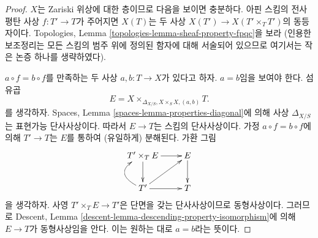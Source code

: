\begin{proof}
$X$는 Zariski 위상에 대한 층이므로 다음을 보이면 충분하다.
아핀 스킴의 전사 평탄 사상 $f : T' \to T$가 주어지면
$X(T)$는 두 사상 $X(T') \to X(T' \times_T T')$의 동등자이다.
Topologies, Lemma \ref{topologies-lemma-sheaf-property-fpqc}을 보라
(인용한 보조정리는 모든 스킴의 범주 위에 정의된 함자에 대해
서술되어 있으므로 여기서는 작은 논증 하나를 생략하였다).

\medskip\noindent
$a \circ f = b \circ f$를 만족하는 두 사상
$a, b : T \to X$가 있다고 하자. $a = b$임을 보여야 한다.
섬유곱
$$
E = X \times_{\Delta_{X/S}, X \times_S X, (a, b)} T.
$$
를 생각하자. Spaces, Lemma \ref{spaces-lemma-properties-diagonal}에 의해
사상 $\Delta_{X/S}$는 표현가능 단사사상이다. 따라서
$E \to T$는 스킴의 단사사상이다. 가정 $a \circ f = b \circ f$에 의해
$T' \to T$는 $E$를 통하여 (유일하게) 분해된다.
가환 그림
$$
\xymatrix{
T' \times_T E \ar[r] \ar[d] & E \ar[d] \\
T' \ar[r] \ar@/^5ex/[u] \ar[ru] & T
}
$$
을 생각하자. 사영 $T' \times_T E \to T'$은 단면을 갖는
단사사상이므로 동형사상이다. 그러므로 Descent, Lemma
\ref{descent-lemma-descending-property-isomorphism}에 의해
$E \to T$가 동형사상임을 안다. 이는 원하는 대로 $a = b$라는 뜻이다.


\end{proof}
